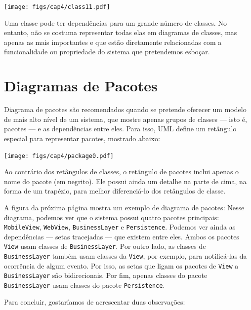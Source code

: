 \documentclass[
  11pt,
  twoside]{book}
\newcommand{\passthrough}[1]{#1}
\begin{document}
\texttt{[image: figs/cap4/class11.pdf]}

Uma classe pode ter dependências para um grande número de classes. No
entanto, não se costuma representar todas elas em diagramas de classes,
mas apenas as mais importantes e que estão diretamente relacionadas com
a funcionalidade ou propriedade do sistema que pretendemos esboçar.

\hypertarget{diagramas-de-pacotes}{%
\section{Diagramas de Pacotes}\label{diagramas-de-pacotes}}

 

Diagrama de pacotes são recomendados quando se pretende oferecer um
modelo de mais alto nível de um sistema, que mostre apenas grupos de
classes --- isto é, pacotes --- e as dependências entre eles. Para isso,
UML define um retângulo especial para representar pacotes, mostrado
abaixo:

\texttt{[image: figs/cap4/package0.pdf]}

Ao contrário dos retângulos de classes, o retângulo de pacotes inclui
apenas o nome do pacote (em negrito). Ele possui ainda um detalhe na
parte de cima, na forma de um trapézio, para melhor diferenciá-lo dos
retângulos de classe.

A figura da próxima página mostra um exemplo de diagrama de pacotes:
Nesse diagrama, podemos ver que o sistema possui quatro pacotes
principais: \passthrough{\lstinline!MobileView!},
\passthrough{\lstinline!WebView!},
\passthrough{\lstinline!BusinessLayer!} e
\passthrough{\lstinline!Persistence!}. Podemos ver ainda as dependências
--- setas tracejadas --- que existem entre eles. Ambos os pacotes
\passthrough{\lstinline!View!} usam classes de
\passthrough{\lstinline!BusinessLayer!}. Por outro lado, as classes de
\passthrough{\lstinline!BusinessLayer!} também usam classes da
\passthrough{\lstinline!View!}, por exemplo, para notificá-las da
ocorrência de algum evento. Por isso, as setas que ligam os pacotes de
\passthrough{\lstinline!View!} a \passthrough{\lstinline!BusinessLayer!}
são bidirecionais. Por fim, apenas classes do pacote
\passthrough{\lstinline!BusinessLayer!} usam classes do pacote
\passthrough{\lstinline!Persistence!}.

Para concluir, gostaríamos de acrescentar duas observações:
\end{document}
